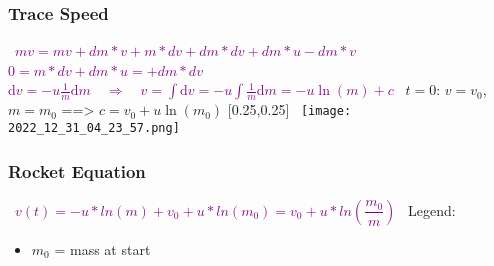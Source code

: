 \documentclass[main.tex,fontsize=8pt,paper=a4,paper=portrait,DIV=calc,]{scrartcl}
\begin{document}
\begin{multicols*}{2}
\subsubsection{Trace Speed}
\, \newline
\large \textcolor{purple}{\( mv = mv + dm * v + m * dv + dm * dv + dm * u - dm * v \)}\newline
\, \newline
\large \textcolor{purple}{\( 0 = m * dv + dm * u =+ dm * dv \)}\newline
\, \newline
\large \textcolor{purple}{\(	\mathrm{d}v = -u \frac{1}{m}\mathrm{d}m \quad\Rightarrow\quad v = \int\mathrm{d}v = -u\int\frac{1}{m}\mathrm{d}m = -u\ln\left(m\right)+c\)}\newline
\, \newline
\(	t=0\): \(v=v_0\), \(m=m_0\) ==> \(  	c = v_0+u\ln\left(m_0\right) \)\newline
{}[0.25,0.25]
\, \newline
\texttt{[image: 2022\_12\_31\_04\_23\_57.png]}

\subsubsection{Rocket Equation}
\, \newline
\large \textcolor{purple}{\( v(t) = -u * ln(m) + v_0 + u * ln(m_0) = v_0 + u * ln\left(\dfrac{m_0}{m}\right) \)}\newline
\, \newline
\normalsize Legend: \newline
\begin{itemize}
\item \(m_0\) = mass at start
\end{itemize} 


\end{multicols*}
\end{document}
